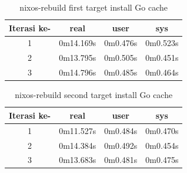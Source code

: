 \documentclass[10pt,]{report}
\begin{document}
\begin{adjustwidth}{20pt}{}
	\begin{table}[H]
		\caption{nixos-rebuild first target install Go cache}
		\begin{center}
			\begin{tabular}[c]{|c|c|c|c|}
				\hline
				\multicolumn{1}{|c|}{\textbf{Iterasi ke-}} &
				\multicolumn{1}{c|}{\textbf{real}}         &
				\multicolumn{1}{c|}{\textbf{user}}         &
				\multicolumn{1}{c|}{\textbf{sys}}                                            \\
				\hline
				1                                          & 0m14.169s & 0m0.476s & 0m0.523s \\
				\hline
				2                                          & 0m13.795s & 0m0.505s & 0m0.451s \\
				\hline
				3                                          & 0m14.796s & 0m0.485s & 0m0.464s \\
				\hline
			\end{tabular}
		\end{center}
	\end{table}
	\vspace{-5mm}
	\begin{table}[H]
		\caption{nixos-rebuild second target install Go cache}
		\begin{center}
			\begin{tabular}[c]{|c|c|c|c|}
				\hline
				\multicolumn{1}{|c|}{\textbf{Iterasi ke-}} &
				\multicolumn{1}{c|}{\textbf{real}}         &
				\multicolumn{1}{c|}{\textbf{user}}         &
				\multicolumn{1}{c|}{\textbf{sys}}                                            \\
				\hline
				1                                          & 0m11.527s & 0m0.484s & 0m0.470s \\
				\hline
				2                                          & 0m14.384s & 0m0.492s & 0m0.454s \\
				\hline
				3                                          & 0m13.683s & 0m0.481s & 0m0.475s \\
				\hline
			\end{tabular}
		\end{center}
	\end{table}

\end{adjustwidth}
\end{document}
